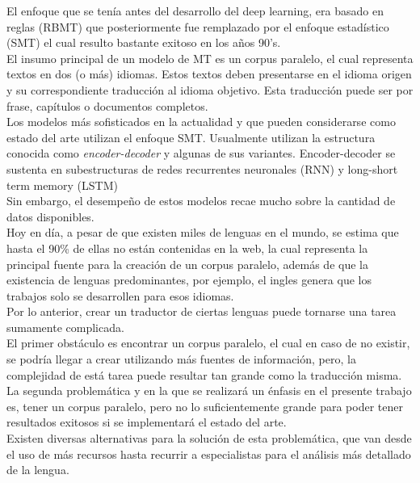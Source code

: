 \documentclass[12pt, letterpaper]{article}
\begin{document}
El enfoque que se tenía antes del desarrollo del deep learning, era basado en reglas (RBMT) que posteriormente fue remplazado por el enfoque estadístico (SMT) el cual resulto bastante exitoso en los años 90's.\\

El insumo principal de un modelo de MT es un corpus paralelo, el cual representa textos en dos (o más) idiomas. Estos textos deben presentarse en el idioma origen y su correspondiente traducción al idioma objetivo. Esta traducción puede ser por frase, capítulos o documentos completos.\\

Los modelos más sofisticados en la actualidad y que pueden considerarse como estado del arte utilizan el enfoque SMT. Usualmente utilizan la estructura conocida como \emph{encoder-decoder} y algunas de sus variantes. Encoder-decoder se sustenta en subestructuras de redes recurrentes neuronales (RNN) y long-short term memory (LSTM)\\

Sin embargo, el desempeño de estos modelos recae mucho sobre la cantidad de datos disponibles.\\

Hoy en día, a pesar de que existen miles de lenguas en el mundo, se estima que hasta el 90\% de ellas no están contenidas en la web, la cual representa la principal fuente para la creación de un corpus paralelo, además de que la existencia de lenguas predominantes, por ejemplo, el ingles genera que los trabajos solo se desarrollen para esos idiomas.\\

Por lo anterior, crear un traductor de ciertas lenguas puede tornarse una tarea sumamente complicada. \\

El primer obstáculo es encontrar un corpus paralelo, el cual en caso de no existir, se podría llegar a crear utilizando más fuentes de información, pero, la complejidad de está tarea puede resultar tan grande como la traducción misma.\\

La segunda problemática y en la que se realizará un énfasis en el presente trabajo es, tener un corpus paralelo, pero no lo suficientemente grande para poder tener resultados exitosos si se implementará el estado del arte.\\

Existen diversas alternativas para la solución de esta problemática, que van desde el uso de más recursos hasta recurrir a especialistas para el análisis más detallado de la lengua. \\
\end{document}
